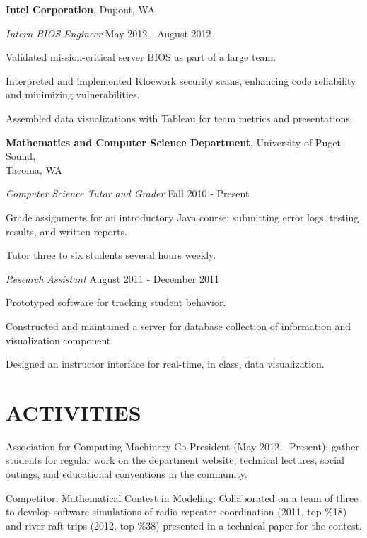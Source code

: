 \documentclass[line,margin]{res}
\newenvironment{itemize*}%
  {\begin{itemize}%
    \setlength{\parsep}{0pt}
    \setlength{\itemsep}{0pt}%
    \setlength{\parskip}{0pt}}%
  {\end{itemize}}
\begin{document}
\begin{resume}
\textbf{Intel Corporation}, Dupont, WA

{\sl Intern BIOS Engineer} \hfill May 2012 - August 2012
\begin{itemize*}
    \item Validated mission-critical server BIOS as part of a large team.
    \item Interpreted and implemented Klocwork security scans, enhancing 
        code reliability and minimizing vulnerabilities.
    \item Assembled data visualizations with Tableau for team metrics and 
        presentations.
\end{itemize*}            

\textbf{Mathematics and Computer Science Department},
University of Puget Sound,\\
Tacoma, WA

{\sl Computer Science Tutor and Grader} \hfill Fall 2010 - Present
\begin{itemize*}  
    \item Grade assignments for an introductory Java course: submitting 
      error logs, testing results, and written reports.
    \item Tutor three to six students several hours weekly.
\end{itemize*}

{\sl Research Assistant} \hfill August 2011 - December 2011
\begin{itemize*}
    \item Prototyped software for tracking student behavior.
    \item Constructed and maintained a server for database collection of 
      information and visualization component.
    \item Designed an instructor interface for real-time, in class, data 
      visualization.
\end{itemize*}            

\vspace*{.2cm}

\section{ACTIVITIES}

\begin{itemize*}
\item Association for Computing Machinery Co-President (May 2012 - Present): gather
    students for regular work on the department website, technical lectures,
    social outings, and educational conventions in the community.
\item Competitor, Mathematical Contest in Modeling: Collaborated on a team of three to 
    develop software simulations of radio repeater coordination (2011, top \%18) and river 
    raft trips (2012, top \%38) presented in a technical paper for the contest.\\
\end{itemize*}


\end{resume}
\end{document}
